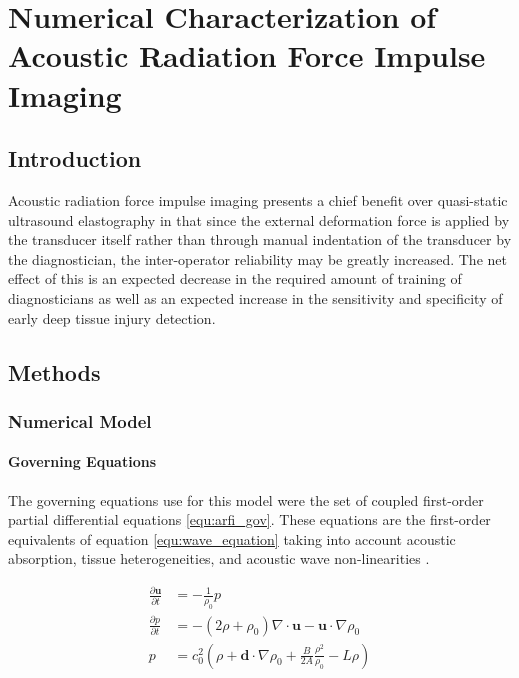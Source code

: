 \chapter{Numerical Characterization of Acoustic Radiation Force Impulse Imaging}
	\label{chap:arfi}
	\section{Introduction}
		Acoustic radiation force impulse imaging presents a chief benefit over quasi-static ultrasound elastography in that since the external deformation force is applied by the transducer itself rather than through manual indentation of the transducer by the diagnostician, the inter-operator reliability may be greatly increased. The net effect of this is an expected decrease in the required amount of training of diagnosticians as well as an expected increase in the sensitivity and specificity of early deep tissue injury detection.

	\section{Methods}
		\subsection{Numerical Model}
			\subsubsection{Governing Equations}
				The governing equations use for this model were the set of coupled first-order partial differential equations \ref{equ:arfi_gov}. These equations are the first-order equivalents of equation \ref{equ:wave_equation} taking into account acoustic absorption, tissue heterogeneities, and acoustic wave non-linearities \cite{treeby12}.

				\begin{subequations}
					\label{equ:arfi_gov}
					\begin{align}
						\frac{\partial \mathbf{u}}{\partial t} &= - \frac{1}{\rho_0} p \label{equ:arfi_gov_p1} \\
						\frac{\partial p}{\partial t} &= -\left(2 \rho + \rho_0\right)\nabla \cdot \mathbf{u} - \mathbf{u} \cdot \nabla \rho_0 \label{equ:arfi_gov_p2} \\
						p &= c_0^2 \left(\rho + \mathbf{d} \cdot \nabla \rho_0 + \frac{B}{2A} \frac{\rho^2}{\rho_0} - L\rho \right) \label{equ:arfi_gov_p3}
					\end{align}
				\end{subequations}

